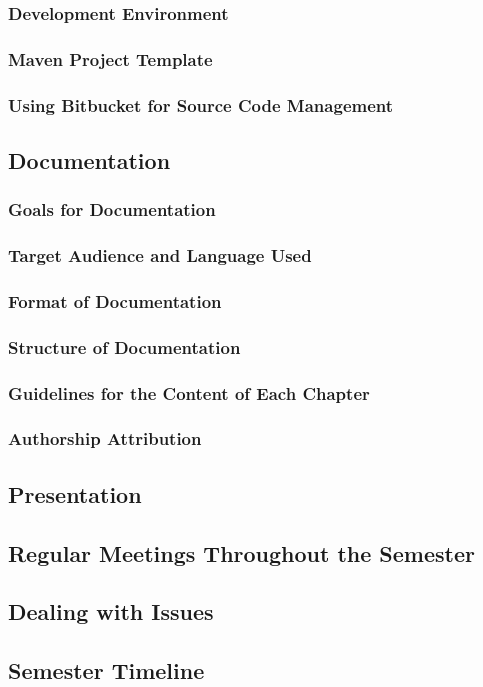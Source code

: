 \subsubsection{Development Environment}
\subsubsection{Maven Project Template}
\subsubsection{Using Bitbucket for Source Code Management}
\subsection{Documentation}
\subsubsection{Goals for Documentation}
\subsubsection{Target Audience and Language Used}
\subsubsection{Format of Documentation}
\subsubsection{Structure of Documentation}
\subsubsection{Guidelines for the Content of Each Chapter}
\subsubsection{Authorship Attribution}
\subsection{Presentation}
\subsection{Regular Meetings Throughout the Semester}
\subsection{Dealing with Issues}
\subsection{Semester Timeline}


